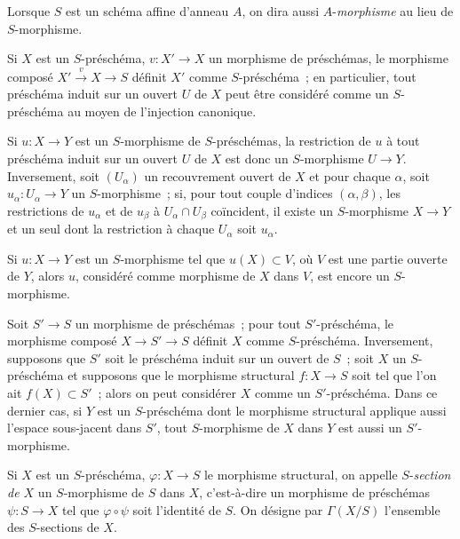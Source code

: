 Lorsque $S$ est un schéma affine d'anneau $A$, on dira aussi
$A$-\emph{morphisme} au lieu de $S$-morphisme.

\begin{env}[2.5.3]
\label{I.2.5.3-fr}
Si $X$ est un $S$-préschéma, $v:X'\to X$ un morphisme de préschémas, le
morphisme composé $X'\xrightarrow{v}X\to S$ définit $X'$ comme
$S$-préschéma~; en particulier, tout préschéma induit sur un ouvert $U$ de
$X$ peut être considéré comme un $S$-préschéma au moyen de l'injection
canonique.

Si $u:X\to Y$ est un $S$-morphisme de $S$-préschémas, la restriction de $u$
à tout préschéma induit sur un ouvert $U$ de $X$ est donc un $S$-morphisme
$U\to Y$. Inversement, soit $(U_\alpha)$ un recouvrement ouvert de $X$ et pour
chaque $\alpha$, soit $u_\alpha:U_\alpha\to Y$ un $S$-morphisme~; si, pour tout
couple d'indices $(\alpha,\beta)$, les restrictions de $u_\alpha$ et de
$u_\beta$ à $U_\alpha\cap U_\beta$ coïncident, il existe un $S$-morphisme
$X\to Y$ et un seul dont la restriction à chaque $U_\alpha$ soit $u_\alpha$.

Si $u:X\to Y$ est un $S$-morphisme tel que $u(X)\subset V$, où $V$ est une
partie ouverte de $Y$, alors $u$, considéré comme morphisme de $X$ dans $V$,
est encore un $S$-morphisme.
\end{env}

\begin{env}[2.5.4]
\label{I.2.5.4-fr}
Soit $S'\to S$ un morphisme de préschémas~; pour tout $S'$-préschéma, le
morphisme composé $X\to S'\to S$ définit $X$ comme $S$-préschéma.
Inversement, supposons que $S'$ soit le préschéma induit sur un ouvert de
$S$~; soit $X$ un $S$-préschéma et supposons que le morphisme structural
$f:X\to S$ soit tel que l'on ait $f(X)\subset S'$~; alors on peut considérer
$X$ comme un $S'$-préschéma. Dans ce dernier cas, si $Y$ est un $S$-préschéma
dont le morphisme structural applique aussi l'espace sous-jacent dans $S'$,
tout $S$-morphisme de $X$ dans $Y$ est aussi un $S'$-morphisme.
\end{env}

\begin{env}[2.5.5]
\label{I.2.5.5-fr}
Si $X$ est un $S$-préschéma, $\varphi:X\to S$ le morphisme structural, on
appelle $S$-\emph{section de $X$} un $S$-morphisme de $S$ dans $X$,
c'est-à-dire un morphisme de préschémas $\psi:S\to X$ tel que
$\varphi\circ\psi$ soit l'identité de $S$. On désigne par $\Gamma(X/S)$
l'ensemble des $S$-sections de $X$.
\end{env}

